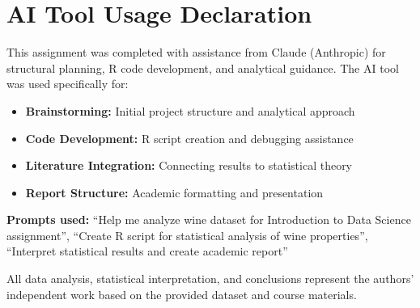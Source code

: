 \chapter*{AI Tool Usage Declaration}

This assignment was completed with assistance from Claude (Anthropic) for structural planning, R code development, and analytical guidance. The AI tool was used specifically for:
\begin{itemize}
\item \textbf{Brainstorming:} Initial project structure and analytical approach
\item \textbf{Code Development:} R script creation and debugging assistance
\item \textbf{Literature Integration:} Connecting results to statistical theory
\item \textbf{Report Structure:} Academic formatting and presentation
\end{itemize}

\textbf{Prompts used:} ``Help me analyze wine dataset for Introduction to Data Science assignment'', ``Create R script for statistical analysis of wine properties'', ``Interpret statistical results and create academic report''

All data analysis, statistical interpretation, and conclusions represent the authors' independent work based on the provided dataset and course materials.